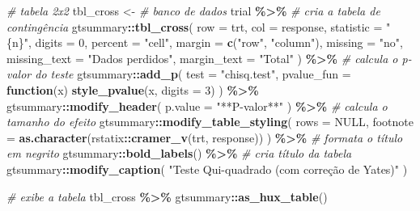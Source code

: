 \documentclass[
  a4paper,
]{book}
\newenvironment{Shaded}{\begin{snugshade}}{\end{snugshade}}
\newcommand{\AttributeTok}[1]{\textcolor[rgb]{0.13,0.29,0.53}{#1}}
\newcommand{\CommentTok}[1]{\textcolor[rgb]{0.56,0.35,0.01}{\textit{#1}}}
\newcommand{\ConstantTok}[1]{\textcolor[rgb]{0.56,0.35,0.01}{#1}}
\newcommand{\ControlFlowTok}[1]{\textcolor[rgb]{0.13,0.29,0.53}{\textbf{#1}}}
\newcommand{\DecValTok}[1]{\textcolor[rgb]{0.00,0.00,0.81}{#1}}
\newcommand{\FunctionTok}[1]{\textcolor[rgb]{0.13,0.29,0.53}{\textbf{#1}}}
\newcommand{\NormalTok}[1]{#1}
\newcommand{\OtherTok}[1]{\textcolor[rgb]{0.56,0.35,0.01}{#1}}
\newcommand{\SpecialCharTok}[1]{\textcolor[rgb]{0.81,0.36,0.00}{\textbf{#1}}}
\newcommand{\StringTok}[1]{\textcolor[rgb]{0.31,0.60,0.02}{#1}}
\begin{document}
\begin{Shaded}
\begin{Highlighting}[]
\CommentTok{\# tabela 2x2}
\NormalTok{tbl\_cross }\OtherTok{\textless{}{-}}
  \CommentTok{\# banco de dados}
\NormalTok{  trial }\SpecialCharTok{\%\textgreater{}\%}
  \CommentTok{\# cria a tabela de contingência}
\NormalTok{  gtsummary}\SpecialCharTok{::}\FunctionTok{tbl\_cross}\NormalTok{(}
    \AttributeTok{row =}\NormalTok{ trt,}
    \AttributeTok{col =}\NormalTok{ response,}
    \AttributeTok{statistic =} \StringTok{"\{n\}"}\NormalTok{,}
    \AttributeTok{digits =} \DecValTok{0}\NormalTok{,}
    \AttributeTok{percent =} \StringTok{"cell"}\NormalTok{,}
    \AttributeTok{margin =} \FunctionTok{c}\NormalTok{(}\StringTok{"row"}\NormalTok{, }\StringTok{"column"}\NormalTok{),}
    \AttributeTok{missing =} \StringTok{"no"}\NormalTok{,}
    \AttributeTok{missing\_text =} \StringTok{"Dados perdidos"}\NormalTok{,}
    \AttributeTok{margin\_text =} \StringTok{"Total"}
\NormalTok{  ) }\SpecialCharTok{\%\textgreater{}\%}
  \CommentTok{\# calcula o p{-}valor do teste}
\NormalTok{  gtsummary}\SpecialCharTok{::}\FunctionTok{add\_p}\NormalTok{(}
    \AttributeTok{test =} \StringTok{"chisq.test"}\NormalTok{,}
    \AttributeTok{pvalue\_fun =} \ControlFlowTok{function}\NormalTok{(x) }\FunctionTok{style\_pvalue}\NormalTok{(x, }\AttributeTok{digits =} \DecValTok{3}\NormalTok{)}
\NormalTok{  ) }\SpecialCharTok{\%\textgreater{}\%}
\NormalTok{  gtsummary}\SpecialCharTok{::}\FunctionTok{modify\_header}\NormalTok{(}
    \AttributeTok{p.value =} \StringTok{"**P{-}valor**"}
\NormalTok{  ) }\SpecialCharTok{\%\textgreater{}\%}
  \CommentTok{\# calcula o tamanho do efeito}
\NormalTok{  gtsummary}\SpecialCharTok{::}\FunctionTok{modify\_table\_styling}\NormalTok{(}
    \AttributeTok{rows =} \ConstantTok{NULL}\NormalTok{,}
    \AttributeTok{footnote =} \FunctionTok{as.character}\NormalTok{(rstatix}\SpecialCharTok{::}\FunctionTok{cramer\_v}\NormalTok{(trt, response))}
\NormalTok{  ) }\SpecialCharTok{\%\textgreater{}\%}
  \CommentTok{\# formata o título em negrito}
\NormalTok{  gtsummary}\SpecialCharTok{::}\FunctionTok{bold\_labels}\NormalTok{() }\SpecialCharTok{\%\textgreater{}\%}
  \CommentTok{\# cria título da tabela}
\NormalTok{  gtsummary}\SpecialCharTok{::}\FunctionTok{modify\_caption}\NormalTok{(}
    \StringTok{"Teste Qui{-}quadrado (com correção de Yates)"}
\NormalTok{  )}

\CommentTok{\# exibe a tabela}
\NormalTok{tbl\_cross }\SpecialCharTok{\%\textgreater{}\%}
\NormalTok{  gtsummary}\SpecialCharTok{::}\FunctionTok{as\_hux\_table}\NormalTok{()}
\end{Highlighting}
\end{Shaded}
\end{document}
